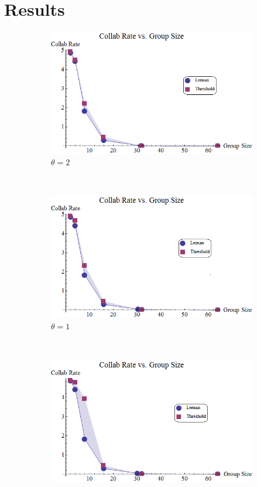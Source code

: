 \documentclass{TeXstyles/DARS/svmult}  %
\begin{document}
\section{Results}
\begin{figure}[!htb]
\begin{subfigure}{0.33\textwidth}
\centering\includegraphics[width=1.0\textwidth]{figures/LermanCollabCompare3.png}
\centering\caption{$\theta=2$}\label{fig:lercol3}
\end{subfigure}~
\begin{subfigure}{0.33\textwidth}
\centering\includegraphics[width=1.0\textwidth]{figures/LermanCollabCompare2.png}
\centering\caption{$\theta=1$}\label{fig:lercol2}
\end{subfigure}~
\begin{subfigure}{0.33\textwidth}
\centering\includegraphics[width=1.0\textwidth]{figures/LermanCollabCompare1.png}

\end{subfigure}
\end{figure}
\end{document}
